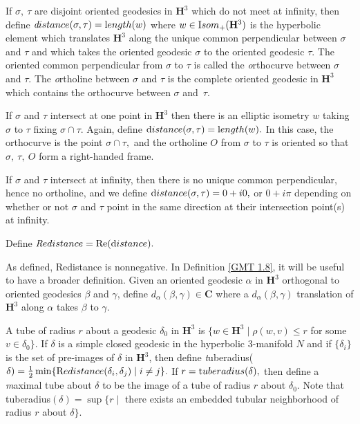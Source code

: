 \begin{definition}\label{GMT 1.4} 
  If $\sigma,\ \tau$ are disjoint oriented geodesics  in 
$\mathbf {H}^3$ which do not meet at infinity,
then define
${\textit distance}(\sigma,\tau)={\textrm length}(w)$ where 
$w\in {\textrm Isom}_+(\mathbf {H}^3)$ is the hyperbolic
element which translates $\mathbf {H}^3$
along the unique common perpendicular between $\sigma$ and $\tau$ and which takes the
oriented geodesic $\sigma$ to the
oriented geodesic $\tau$.  The oriented common perpendicular from $\sigma$ to $\tau$ is
called the {\textit orthocurve} between $\sigma$
and $\tau$.  The {\textit ortholine} between $\sigma$ and $\tau$ is the complete oriented
geodesic in $\mathbf {H}^3$ which contains the
orthocurve between $\sigma$ and~$\tau$.

If $\sigma$ and $\tau$ intersect at one point in $\mathbf {H}^3$ then 
there is an elliptic isometry $w$ taking $\sigma$ to $\tau$ fixing $\sigma \cap \tau.$  Again,  define ${\textrm distance}(\sigma, \tau) = {\textrm length}(w).$  In this case, the orthocurve is the point $\sigma \cap \tau,$ and the ortholine $O$ from $\sigma$ to $\tau$ is oriented
so that $\sigma,\ \tau,\ O$ form a right-handed frame.

If $\sigma$ and $\tau$ intersect at infinity, then there is no unique common perpendicular, hence no ortholine, and we define
${\textrm distance}(\sigma,\tau) = 0 + i0,$ or $0 + i\pi$ depending on whether or not $\sigma$ and $\tau$ point in the same direction at their intersection point(s) at infinity.

Define ${\textit Redistance} = \mathrm {Re} ({\textrm distance}).$

As defined, Redistance is nonnegative.
In Definition \ref{GMT 1.8},
it will be useful to have a broader definition. Given an oriented
geodesic $\alpha$ in $\mathbf {H}^3$ orthogonal to oriented geodesics $\beta$ and $\gamma$, define $d_\alpha(\beta,\gamma) \in \mathbf {C}$ where a
$d_\alpha(\beta,\gamma)$ translation of $\mathbf {H}^3$  along $\alpha$ takes $\beta$ to $\gamma.$
\end{definition}


\begin{definition} \label{GMT 1.6}
A tube of radius $r$ about a geodesic $\delta_0$ in $\mathbf {H}^3$ is 
$\{w \in \mathbf {H}^3 \mid \rho(w, v) \le r$ for some $v \in \delta_0 \}.$    
If $\delta$
is a simple closed geodesic in the hyperbolic $3$-manifold $N$ and if
$\{\delta_i \}$ is the set of pre-images of $\delta$ in $\mathbf {H}^3$, then define
{\textit tuberadius}($\delta)={1 \over 2} \min 
\{{\textrm Redistance}(\delta_i,\delta_j) \mid i\neq j \}.$
If $r = {\textrm tuberadius}(\delta),$ 
then define a {\textit maximal tube} about $\delta$ to be the
image of a tube of radius $r$ about $\delta_0.$  Note that
tuberadius$(\delta)=
\sup\{r \mid $ there exists an embedded tubular neighborhood of
radius $r$ about $\delta \}.$
\end{definition}

